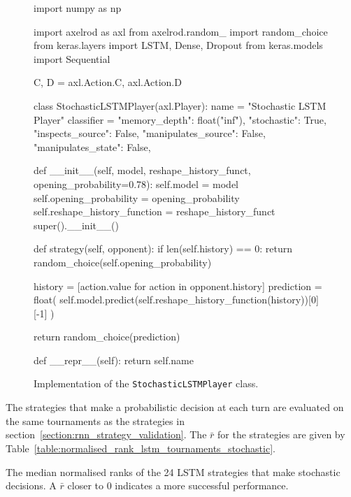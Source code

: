 \begin{figure}[!htbp]
\begin{sourcepy}
import numpy as np

import axelrod as axl
from axelrod.random_ import random_choice
from keras.layers import LSTM, Dense, Dropout
from keras.models import Sequential

C, D = axl.Action.C, axl.Action.D


class StochasticLSTMPlayer(axl.Player):
name = "Stochastic LSTM Player"
classifier = {
    "memory_depth": float("inf"),
    "stochastic": True,
    "inspects_source": False,
    "manipulates_source": False,
    "manipulates_state": False,
}

def __init__(self, model, reshape_history_funct, opening_probability=0.78):
    self.model = model
    self.opening_probability = opening_probability
    self.reshape_history_function = reshape_history_funct
    super().__init__()

def strategy(self, opponent):
    if len(self.history) == 0:
        return random_choice(self.opening_probability)

    history = [action.value for action in opponent.history]
    prediction = float(
        self.model.predict(self.reshape_history_function(history))[0][-1]
    )

    return random_choice(prediction)

def __repr__(self):
    return self.name

\end{sourcepy}
\caption{Implementation of the \texttt{StochasticLSTMPlayer} class.}\label{fig:stochastic_lstm_player_source_code}
\end{figure}

The \lstmstrategies strategies that make a probabilistic decision at each turn
are evaluated on the same \metatournamentslstm tournaments as the strategies
in section~\ref{section:rnn_strategy_validation}. The \(\bar{r}\) for the
strategies are given by Table~\ref{table:normalised_rank_lstm_tournaments_stochastic}.

\begin{table}[!htbp]
    \begin{center}
    \resizebox{.9\textwidth}{!}{
        
    }
\end{center}
\caption{The median normalised ranks of the 24 LSTM strategies that make stochastic
decisions. A \(\bar{r}\) closer to 0 indicates a more successful performance.}
\label{table:normalised_rank_lstm_tournaments_stochastic}
\end{table}

